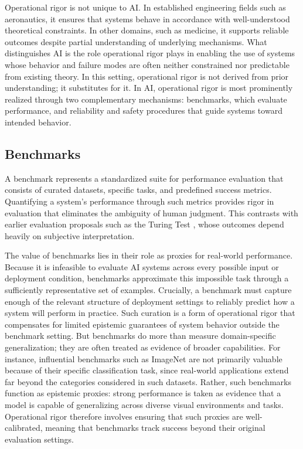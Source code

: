 \documentclass{article}
\begin{document}
Operational rigor is not unique to AI.
In established engineering fields such as aeronautics, it ensures that systems behave in accordance with well-understood theoretical constraints.
In other domains, such as medicine, it supports reliable outcomes despite partial understanding of underlying mechanisms.
What distinguishes AI is the role operational rigor plays in enabling the use of systems whose behavior and failure modes are often neither constrained nor predictable from existing theory.
In this setting, operational rigor is not derived from prior understanding; it substitutes for it.
In AI, operational rigor is most prominently realized through two complementary mechanisms: benchmarks, which evaluate performance, and reliability and safety procedures that guide systems toward intended behavior.


\subsection{Benchmarks}

A benchmark represents a standardized suite for performance evaluation that consists of curated datasets, specific tasks, and predefined success metrics.
Quantifying a system's performance through such metrics provides rigor in evaluation that eliminates the ambiguity of human judgment.
This contrasts with earlier evaluation proposals such as the Turing Test \cite{Turing1950Computing}, whose outcomes depend heavily on subjective interpretation.

The value of benchmarks lies in their role as proxies for real-world performance.
Because it is infeasible to evaluate AI systems across every possible input or deployment condition, benchmarks approximate this impossible task through a sufficiently representative set of examples.
Crucially, a benchmark must capture enough of the relevant structure of deployment settings to reliably predict how a system will perform in practice.
Such curation is a form of operational rigor that compensates for limited epistemic guarantees of system behavior outside the benchmark setting.
But benchmarks do more than measure domain-specific generalization; they are often treated as evidence of broader capabilities.
For instance, influential benchmarks such as ImageNet \cite{Deng2009ImageNet} are not primarily valuable because of their specific classification task, since real-world applications extend far beyond the categories considered in such datasets.
Rather, such benchmarks function as epistemic proxies: strong performance is taken as evidence that a model is capable of generalizing across diverse visual environments and tasks.
Operational rigor therefore involves ensuring that such proxies are well-calibrated, meaning that benchmarks track success beyond their original evaluation settings.
\end{document}
